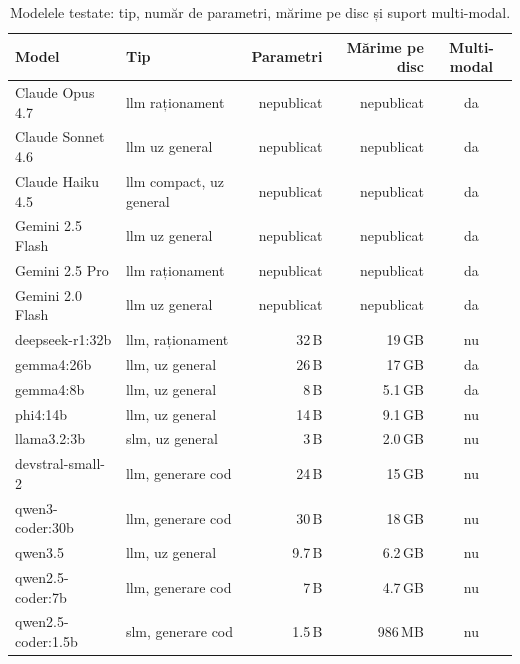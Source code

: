 \documentclass[12pt, a4paper, oneside, romanian]{teza-upb}
\begin{document}
  \begin{table}[H]
    \centering
    \scriptsize
    \setlength{\tabcolsep}{5pt}
    \renewcommand{\arraystretch}{1.1}
    \begin{tabular}{@{}llrrc@{}}
      \toprule
      \textbf{Model} & \textbf{Tip} & \textbf{Parametri} & \textbf{Mărime pe disc} & \textbf{Multi-modal} \\
      \midrule
      Claude Opus 4.7        & \ac{llm} raționament       & nepublicat & nepublicat      & da \\
      Claude Sonnet 4.6      & \ac{llm} uz general        & nepublicat & nepublicat      & da \\
      Claude Haiku 4.5       & \ac{llm} compact, uz general         & nepublicat & nepublicat      & da \\
      Gemini 2.5 Flash       & \ac{llm} uz general        & nepublicat & nepublicat      & da \\
      Gemini 2.5 Pro         & \ac{llm} raționament       & nepublicat & nepublicat      & da \\
      Gemini 2.0 Flash       & \ac{llm} uz general        & nepublicat & nepublicat      & da \\
      \midrule
      deepseek-r1:32b        & \ac{llm}, raționament                & 32\,B      & 19\,GB  & nu \\
      gemma4:26b             & \ac{llm}, uz general                 & 26\,B      & 17\,GB  & da \\
      gemma4:8b              & \ac{llm}, uz general                 & 8\,B       & 5.1\,GB & da \\
      phi4:14b               & \ac{llm}, uz general                 & 14\,B      & 9.1\,GB & nu \\
      llama3.2:3b            & \ac{slm}, uz general                 & 3\,B       & 2.0\,GB & nu \\
      devstral-small-2       & \ac{llm}, generare cod               & 24\,B & 15\,GB  & nu \\
      qwen3-coder:30b        & \ac{llm}, generare cod               & 30\,B      & 18\,GB  & nu \\
      qwen3.5                & \ac{llm}, uz general                 & 9.7\,B     & 6.2\,GB & nu \\
      qwen2.5-coder:7b       & \ac{llm}, generare cod               & 7\,B       & 4.7\,GB & nu \\
      qwen2.5-coder:1.5b     & \ac{slm}, generare cod               & 1.5\,B     & 986\,MB & nu \\
      \bottomrule
    \end{tabular}
    \caption{Modelele testate: tip, număr de parametri, mărime pe disc și suport multi-modal.}
    \label{tab:modele-testate}
  \end{table}
\end{document}

